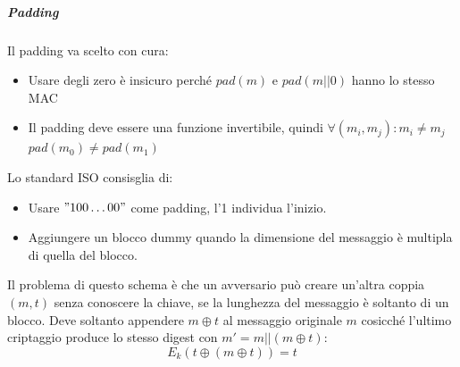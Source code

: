 \documentclass[a4paper,12pt]{article}
\begin{document}
\subparagraph{Padding} Il padding va scelto con cura:
\begin{itemize}
	\item Usare degli zero è insicuro perché $pad(m)$ e $pad(m||0)$ hanno lo stesso MAC 
	\item Il padding deve essere una funzione invertibile, quindi $\forall(m_i,m_j) : m_i \neq m_j$ \\ $pad(m_0) \neq pad(m_1)$
\end{itemize}
Lo standard ISO consisglia di:
\begin{itemize}
	\item Usare $"100\ldots00"$ come padding, l'1 individua l'inizio.
	\item Aggiungere un blocco dummy quando la dimensione del messaggio è multipla di quella del blocco.
\end{itemize}
Il problema di questo schema è che un avversario può creare un'altra coppia $(m,t)$ senza conoscere la chiave, se la lunghezza del messaggio è soltanto di un blocco.
Deve soltanto appendere $m \oplus t$ al messaggio originale $m$ cosicché l'ultimo criptaggio produce lo stesso digest con $m' = m||(m \oplus t)$:
$$ E_k(t \oplus (m \oplus t)) = t $$

\newpage
\end{document}
